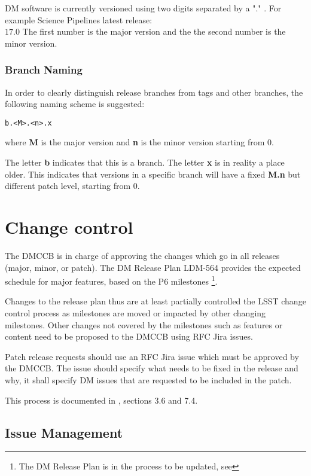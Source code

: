 DM software is currently versioned using two digits separated by a "." .
For example Science Pipelines latest release:\\
$17.0$
The first number is the major version and the the second number is the minor version.


\subsubsection{Branch Naming} \label{sec:branchnaming}

In order to clearly distinguish release branches from tags and other branches, the following naming scheme is suggested:

\begin{verbatim}
b.<M>.<n>.x
\end{verbatim}

where {\bf M} is the major version and {\bf n} is the minor version starting from 0.

The letter  {\bf b} indicates that this is a branch.
The letter {\bf x} is in reality a place older. This indicates that versions in a specific branch will have a fixed {\bf M.n} but different patch level, starting from 0.

\newpage
\section{Change control} \label{sec:changecontrol}

The DMCCB is in charge of approving the changes which go in  all releases (major, minor, or patch).
The DM Release Plan LDM-564 provides the expected schedule for major features, based on the P6 milestones \footnote{The DM Release Plan is in the process to be updated, see }.

Changes to the release plan  thus are  at least partially controlled the LSST change control  process as  milestones are moved or impacted by other changing milestones. Other changes not covered by the milestones such as features or content need to be proposed to the DMCCB using RFC Jira issues.

Patch release requests should use an RFC Jira issue which must be approved by the DMCCB.
The issue should specify what needs to be fixed in the release and why, it shall specify DM issues that are requested to be included in the patch.

This process is documented in , sections 3.6 and 7.4.


\subsection{Issue Management} \label{sec:issues}

